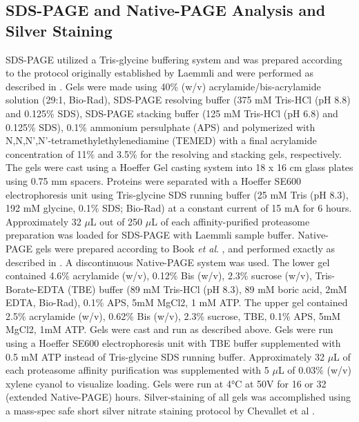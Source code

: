 \subsection{SDS-PAGE and Native-PAGE Analysis and Silver Staining}
	SDS-PAGE utilized a Tris-glycine buffering system and was prepared according to the protocol originally established by Laemmli \citep{laemmli70} and were performed as described in \citep{marshall17}. Gels were made using 40\% (w/v) acrylamide/bis-acrylamide solution (29:1, Bio-Rad), SDS-PAGE resolving buffer (375 mM Tris-HCl (pH 8.8) and 0.125\% SDS), SDS-PAGE stacking buffer (125 mM Tris-HCl (pH 6.8) and 0.125\% SDS), 0.1\% ammonium persulphate (APS) and polymerized with N,N,N’,N’-tetramethylethylenediamine (TEMED) with a final acrylamide concentration of 11\% and 3.5\% for the resolving and stacking gels, respectively. The gels were cast using a Hoeffer Gel casting system into 18 x 16 cm glass plates using 0.75 mm spacers. Proteins were separated with a Hoeffer SE600 electrophoresis unit using Tris-glycine SDS running buffer (25 mM Tris (pH 8.3), 192 mM glycine, 0.1\% SDS; Bio-Rad) at a constant current of 15 mA for 6 hours. Approximately 32 $\mu$L out of 250 $\mu$L of each affinity-purified proteasome preparation was loaded for SDS-PAGE with Laemmli sample buffer. 	 
Native-PAGE gels were prepared according to Book \textit{et al}. \citep{book10}, and performed exactly as described in \citep{marshall17}. A discontinuous Native-PAGE system was used. The lower gel contained 4.6\% acrylamide (w/v), 0.12\% Bis (w/v), 2.3\% sucrose (w/v), Tris-Borate-EDTA (TBE) buffer (89 mM Tris-HCl (pH 8.3), 89 mM boric acid, 2mM EDTA, Bio-Rad), 0.1\% APS, 5mM MgCl2, 1 mM ATP. The upper gel contained 2.5\% acrylamide (w/v), 0.62\% Bis (w/v), 2.3\% sucrose, TBE, 0.1\% APS, 5mM MgCl2, 1mM ATP. Gels were cast and run as described above. Gels were run using a Hoeffer SE600 electrophoresis unit with TBE buffer supplemented with 0.5 mM ATP instead of Tris-glycine SDS running buffer. Approximately 32 $\mu$L of each proteasome affinity purification was supplemented with 5 $\mu$L of 0.03\% (w/v) xylene cyanol to visualize loading. Gels were run at 4°C at 50V for 16 or 32 (extended Native-PAGE) hours. Silver-staining of all gels was accomplished using a mass-spec safe short silver nitrate staining protocol by Chevallet et al \citep{chevallet06}.
